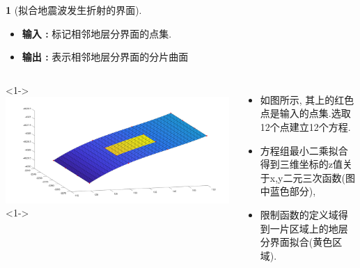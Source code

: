 \documentclass[UTF8]{ctexbeamer}	%
\newcommand{\N}{\mathbb{N}}
\theoremstyle{plain}
\newtheorem{cor}{Corollary}[section]
\theoremstyle{definition}
\newtheorem{emt}{}[section]
\theoremstyle{remark}
\numberwithin{equation}{section}
\begin{document}
\begin{frame}
  \begin{emt}[拟合地震波发生折射的界面]
    \begin{itemize}
        \item \textbf{输入 : } 标记相邻地层分界面的点集.
        \item \textbf{输出 : } 表示相邻地层分界面的分片曲面
    \end{itemize}
    
    \begin{columns}
        <1->
        \includegraphics[width = \textwidth]{fig/s2p2.png}
        <1->
        \begin{itemize}
        \item 如图所示, 其上的红色点是输入的点集.选取12个点建立12个方程.
        \item 方程组最小二乘拟合得到三维坐标的z值关于x,y二元三次函数(图中蓝色部分),
        \item 限制函数的定义域得到一片区域上的地层分界面拟合(黄色区域).
        \end{itemize}
    \end{columns}

      
  \end{emt}
\end{frame}






\end{document}
